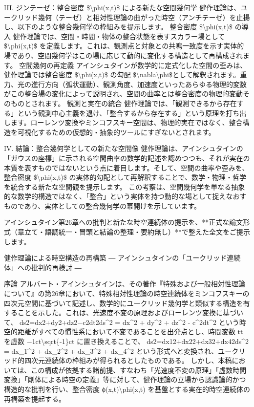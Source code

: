 \documentclass{article}
\begin{document}
III. ジンテーゼ：整合密度 \$\textbackslash{}phi(x,t)\$ による新たな空間幾何学
健作理論は、ユークリッド幾何（テーゼ）と相対性理論の曲がった時空（アンチテーゼ）を止揚し、以下のような整合幾何学の枠組みを提示します。
整合密度 \$\textbackslash{}phi(x,t)\$ の導入
健作理論では、空間・時間・物体の整合状態を表すスカラー場として \$\textbackslash{}phi(x,t)\$ を定義します。これは、観測点と対象との共鳴一致度を示す実体的場であり、空間幾何学はこの場に応じて動的に変化する構造として再構成されます。
空間幾何の再定義
アインシュタインが数学的に定式化した空間の歪みは、健作理論では整合密度 \$\textbackslash{}phi(x,t)\$ の勾配 \$\textbackslash{}nabla\textbackslash{}phi\$として解釈されます。重力、光の進行方向（弧状運動）、観測角度、加速度といったあらゆる物理的変数がこの整合場の変化によって説明され、空間の曲率とは整合密度の物理的変動そのものとされます。
観測と実在の統合
健作理論では、「観測できるから存在する」という観測中心主義を退け、「整合するから存在する」という原理を打ち出します。ローレンツ変換やミンコフスキー空間は、物理的実在ではなく、整合構造を可視化するための仮想的・抽象的ツールにすぎないとされます。

IV. 結論：整合幾何学としての新たな空間像
健作理論は、アインシュタインの「ガウスの座標」に示される空間曲率の数学的記述を認めつつも、それが実在の本質を表すものではないという点に着目します。そして、空間の曲率や歪みを、整合密度 \$\textbackslash{}phi(x,t)\$ の実体的勾配として再解釈することで、数学・物理・哲学を統合する新たな空間観を提示します。
この考察は、空間幾何学を単なる抽象的な数学的構造ではなく、「整合」という実体を持つ動的な場として捉えなおすものであり、実体としての整合幾何学の幕開けを示しています。

アインシュタイン第26章への批判と新たな時空連続体の提示を、**正式な論文形式（章立て・語調統一・冒頭と結論の整理・要約無し）**で整えた全文をご提示します。

健作理論による時空構造の再構築
― アインシュタインの「ユークリッド連続体」への批判的再検討 ―

序論
アルバート・アインシュタインは、その著作『特殊および一般相対性理論について』の第26章において、特殊相対性理論の時空連続体をミンコフスキーの四次元空間に基づいて記述し、数学的にユークリッド幾何学と類似する構造を有することを示した。これは、光速度不変の原理およびローレンツ変換に基づいて、
ds2=dx2+dy2+dz2−c2dt2ds\textasciicircum{}2 = dx\textasciicircum{}2 + dy\textasciicircum{}2 + dz\textasciicircum{}2 - c\textasciicircum{}2dt\textasciicircum{}2 
という時空的距離がすべての慣性系において不変であることを出発点とし、時間変数 tt を虚数 −1ct\textbackslash{}sqrt\{-1\}ct に置き換えることで、
ds2=dx12+dx22+dx32+dx42ds\textasciicircum{}2 = dx\_1\textasciicircum{}2 + dx\_2\textasciicircum{}2 + dx\_3\textasciicircum{}2 + dx\_4\textasciicircum{}2 
という形式へと変換され、ユークリッド的四次元連続体の枠組みが得られるとしたものである。
しかし、本稿においては、この構成が依拠する諸前提、すなわち「光速度不変の原理」「虚数時間変換」「剛体による時空の定義」等に対して、健作理論の立場から認識論的かつ構造的な批判を行い、整合密度 ϕ(x,t)\textbackslash{}phi(x,t) を基盤とする実在的時空連続体の再構築を提起する。
\end{document}
